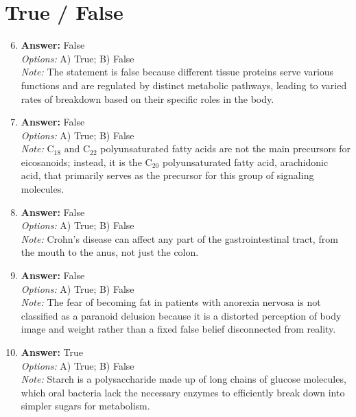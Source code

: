 \documentclass[12pt]{article}
\begin{document}
\section*{True / False}
\begin{enumerate}[label=\arabic*.]
\setcounter{enumi}{5}
\item \textbf{Answer:} False
\\ \textit{Options:} A) True; B) False
\\ \textit{Note:} The statement is false because different tissue proteins serve various functions and are regulated by distinct metabolic pathways, leading to varied rates of breakdown based on their specific roles in the body.
\item \textbf{Answer:} False
\\ \textit{Options:} A) True; B) False
\\ \textit{Note:} C$_{18}$ and C$_{22}$ polyunsaturated fatty acids are not the main precursors for eicosanoids; instead, it is the C$_{20}$ polyunsaturated fatty acid, arachidonic acid, that primarily serves as the precursor for this group of signaling molecules.
\item \textbf{Answer:} False
\\ \textit{Options:} A) True; B) False
\\ \textit{Note:} Crohn's disease can affect any part of the gastrointestinal tract, from the mouth to the anus, not just the colon.
\item \textbf{Answer:} False
\\ \textit{Options:} A) True; B) False
\\ \textit{Note:} The fear of becoming fat in patients with anorexia nervosa is not classified as a paranoid delusion because it is a distorted perception of body image and weight rather than a fixed false belief disconnected from reality.
\item \textbf{Answer:} True
\\ \textit{Options:} A) True; B) False
\\ \textit{Note:} Starch is a polysaccharide made up of long chains of glucose molecules, which oral bacteria lack the necessary enzymes to efficiently break down into simpler sugars for metabolism.
\end{enumerate}
\end{document}
